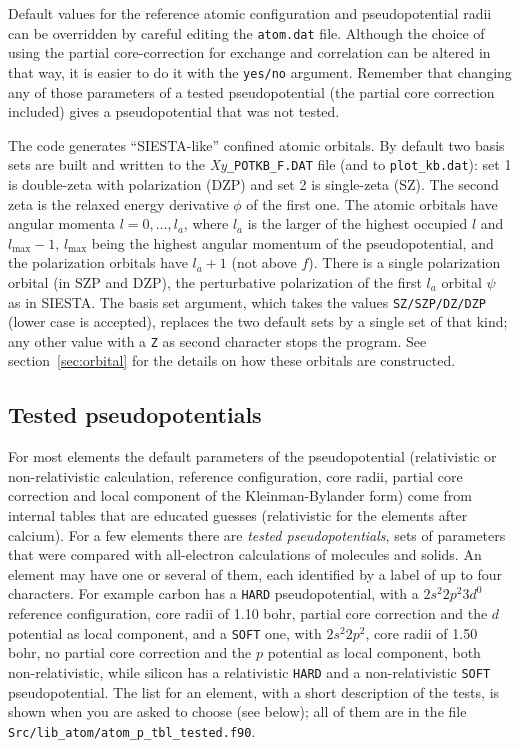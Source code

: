 \documentclass[11pt]{article}
\begin{document}
Default values for the reference atomic configuration and pseudopotential radii
can be overridden by careful editing the \texttt{atom.dat} file.  Although the choice of
using the partial core-correction for exchange and correlation can
be altered in that way, it is easier to do it with the \texttt{yes/no} argument.
Remember that changing any of those parameters of a tested pseudopotential
(the partial core correction included) gives a pseudopotential that was not tested.

The code generates ``\textsc{SIESTA}-like'' confined atomic orbitals.  By default two
basis sets are built and written to the \textit{Xy}\texttt{\_POTKB\_F.DAT} file
(and to \texttt{plot\_kb.dat}): set 1 is double-zeta with polarization (DZP)
and set 2 is single-zeta (SZ).  The second zeta is the relaxed energy derivative
$\phi$ of the first one.
The atomic orbitals have angular momenta $l = 0, \ldots, l_a$, where $l_a$ is the larger
of the highest occupied $l$ and $l_{\max}-1$, $l_{\max}$ being the highest angular momentum
of the pseudopotential, and the polarization orbitals have $l_a+1$ (not above $f$).
There is a single polarization orbital (in SZP and DZP), the perturbative polarization
of the first $l_a$ orbital $\psi$ as in \textsc{SIESTA}.
The basis set argument, which takes the values
\texttt{SZ/SZP/DZ/DZP} (lower case is accepted), replaces the two default sets
by a single set of that kind; any other value with a \texttt{Z} as second character
stops the program.
See section~\ref{sec:orbital} for the details on how these orbitals are constructed.


\subsection{Tested pseudopotentials}
\label{sec:tested}

For most elements the default parameters of the pseudopotential (relativistic or
non-relativistic calculation, reference configuration,
core radii, partial core correction and local component of the Kleinman-Bylander form)
come from internal tables that are educated guesses
(relativistic for the elements after calcium).
For a few elements there are \textit{tested pseudopotentials}, sets of parameters that were
compared with all-electron calculations of molecules and solids.
An element may have one or several of them, each identified by a label of up to
four characters.
For example carbon has a \texttt{HARD} pseudopotential, with a $2s^2 2p^2 3d^0$
reference configuration, core radii of 1.10 bohr, partial core correction and the
$d$ potential as local component, and a \texttt{SOFT} one, with $2s^2 2p^2$, core radii
of 1.50 bohr, no partial core correction and the $p$ potential as local component,
both non-relativistic, while silicon has a relativistic \texttt{HARD} and a
non-relativistic \texttt{SOFT} pseudopotential.
The list for an element, with a short description of the tests, is shown when
you are asked to choose (see below); all of them are in the file
\texttt{Src/lib\_atom/atom\_p\_tbl\_tested.f90}.
\end{document}
